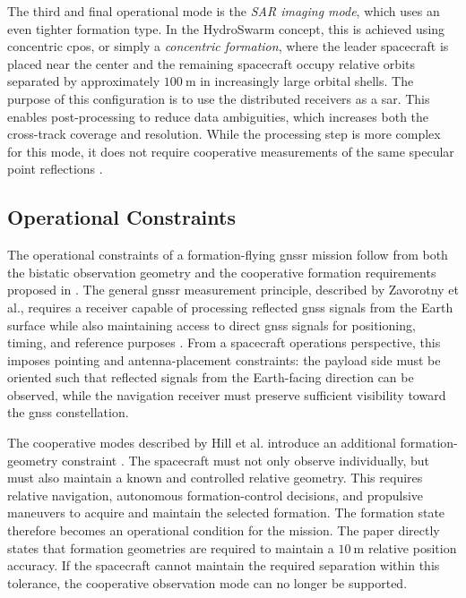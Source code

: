 The third and final operational mode is the \textit{SAR imaging mode}, which uses an even tighter formation type. In the HydroSwarm concept, this is achieved using concentric \gls{cpo}s, or simply a \textit{concentric formation}, where the leader spacecraft is placed near the center and the remaining spacecraft occupy relative orbits separated by approximately $100~\mathrm{m}$ in increasingly large orbital shells. The purpose of this configuration is to use the distributed receivers as a \gls{sar}. This enables post-processing to reduce data ambiguities, which increases both the  cross-track coverage and resolution. While the processing step is more complex for this mode, it does not require cooperative measurements of the same specular point reflections \cite{hill2025hydroswarm}. 


\subsection{Operational Constraints}
\label{sec:gnssr_constraints}

The operational constraints of a formation-flying \gls{gnssr} mission follow from both the bistatic observation geometry and the cooperative formation requirements proposed in \cite{hill2025hydroswarm}. The general \gls{gnssr} measurement principle, described by Zavorotny et al., requires a receiver capable of processing reflected \gls{gnss} signals from the Earth surface while also maintaining access to direct \gls{gnss} signals for positioning, timing, and reference purposes \cite{zavorotny2014tutorial}. From a spacecraft operations perspective, this imposes pointing and antenna-placement constraints: the payload side must be oriented such that reflected signals from the Earth-facing direction can be observed, while the navigation receiver must preserve sufficient visibility toward the \gls{gnss} constellation.

The cooperative modes described by Hill et al. introduce an additional formation-geometry constraint \cite{hill2025hydroswarm}. The spacecraft must not only observe individually, but must also maintain a known and controlled relative geometry. This requires relative navigation, autonomous formation-control decisions, and propulsive maneuvers to acquire and maintain the selected formation. The formation state therefore becomes an operational condition for the mission. The paper directly states that formation geometries are required to maintain a $10~\mathrm{m}$ relative position accuracy. If the spacecraft cannot maintain the required separation within this tolerance, the cooperative observation mode can no longer be supported.

